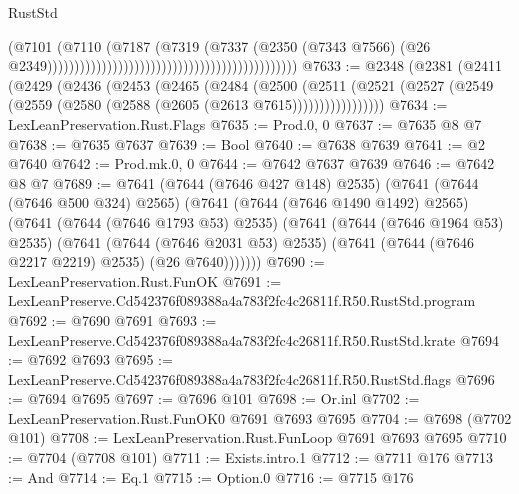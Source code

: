 \begin{lexlean}{RustStd}
\begin{coremodule}
                                                                                  (@7101
                                                                                    (@7110
                                                                                      (@7187
                                                                                        (@7319
                                                                                          (@7337
                                                                                            (@2350
                                                                                              (@7343
                                                                                                @7566)
                                                                                              (@26
                                                                                                @2349))))))))))))))))))))))))))))))))))))))))))))))
@7633 := @2348
    (@2381
      (@2411
        (@2429
          (@2436
            (@2453
              (@2465
                (@2484
                  (@2500
                    (@2511
                      (@2521 (@2527 (@2549 (@2559 (@2580 (@2588 (@2605 (@2613 @7615)))))))))))))))))
@7634 := LexLeanPreservation.Rust.Flags
@7635 := Prod.{0, 0}
@7637 := @7635 @8 @7
@7638 := @7635 @7637
@7639 := Bool
@7640 := @7638 @7639
@7641 := @2 @7640
@7642 := Prod.mk.{0, 0}
@7644 := @7642 @7637 @7639
@7646 := @7642 @8 @7
@7689 := @7641
    (@7644 (@7646 @427 @148) @2535)
    (@7641
      (@7644 (@7646 @500 @324) @2565)
      (@7641
        (@7644 (@7646 @1490 @1492) @2565)
        (@7641
          (@7644 (@7646 @1793 @53) @2535)
          (@7641
            (@7644 (@7646 @1964 @53) @2535)
            (@7641
              (@7644 (@7646 @2031 @53) @2535)
              (@7641 (@7644 (@7646 @2217 @2219) @2535) (@26 @7640)))))))
@7690 := LexLeanPreservation.Rust.FunOK
@7691 := LexLeanPreserve.Cd542376f089388a4a783f2fc4c26811f.R50.RustStd.program
@7692 := @7690 @7691
@7693 := LexLeanPreserve.Cd542376f089388a4a783f2fc4c26811f.R50.RustStd.krate
@7694 := @7692 @7693
@7695 := LexLeanPreserve.Cd542376f089388a4a783f2fc4c26811f.R50.RustStd.flags
@7696 := @7694 @7695
@7697 := @7696 @101
@7698 := Or.inl
@7702 := LexLeanPreservation.Rust.FunOK0 @7691 @7693 @7695
@7704 := @7698 (@7702 @101)
@7708 := LexLeanPreservation.Rust.FunLoop @7691 @7693 @7695
@7710 := @7704 (@7708 @101)
@7711 := Exists.intro.{1}
@7712 := @7711 @176
@7713 := And
@7714 := Eq.{1}
@7715 := Option.{0}
@7716 := @7715 @176

\end{coremodule}
\end{lexlean}
